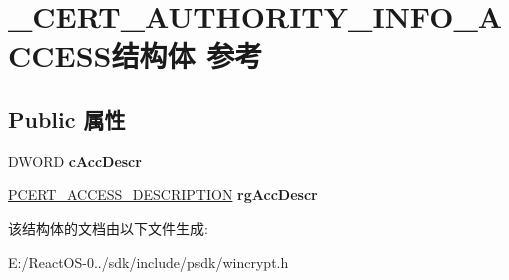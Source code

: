 \hypertarget{struct___c_e_r_t___a_u_t_h_o_r_i_t_y___i_n_f_o___a_c_c_e_s_s}{}\section{\+\_\+\+C\+E\+R\+T\+\_\+\+A\+U\+T\+H\+O\+R\+I\+T\+Y\+\_\+\+I\+N\+F\+O\+\_\+\+A\+C\+C\+E\+S\+S结构体 参考}
\label{struct___c_e_r_t___a_u_t_h_o_r_i_t_y___i_n_f_o___a_c_c_e_s_s}
\subsection*{Public 属性}
\begin{DoxyCompactItemize}
\item 
\mbox{\label{struct___c_e_r_t___a_u_t_h_o_r_i_t_y___i_n_f_o___a_c_c_e_s_s_a4977114592cca5527199bb5953b42edd}} 
D\+W\+O\+RD {\bfseries c\+Acc\+Descr}
\item 
\mbox{\label{struct___c_e_r_t___a_u_t_h_o_r_i_t_y___i_n_f_o___a_c_c_e_s_s_a9d8bb88be6f46bd3a262603aded6a8e2}} 
\hyperlink{struct___c_e_r_t___a_c_c_e_s_s___d_e_s_c_r_i_p_t_i_o_n}{P\+C\+E\+R\+T\+\_\+\+A\+C\+C\+E\+S\+S\+\_\+\+D\+E\+S\+C\+R\+I\+P\+T\+I\+ON} {\bfseries rg\+Acc\+Descr}
\end{DoxyCompactItemize}


该结构体的文档由以下文件生成\+:\begin{DoxyCompactItemize}
\item 
E\+:/\+React\+O\+S-\/0../sdk/include/psdk/wincrypt.\+h\end{DoxyCompactItemize}
